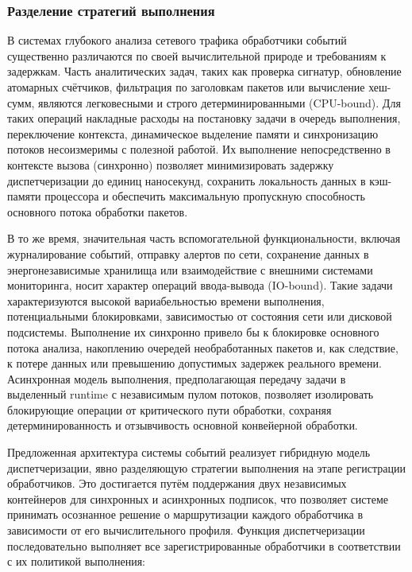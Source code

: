\subsubsection{Разделение стратегий выполнения}
В системах глубокого анализа сетевого трафика обработчики событий существенно различаются по своей вычислительной природе и требованиям к задержкам.
Часть аналитических задач, таких как проверка сигнатур, обновление атомарных счётчиков, фильтрация по заголовкам пакетов или вычисление хеш-сумм, являются легковесными и строго детерминированными (CPU-bound).
Для таких операций накладные расходы на постановку задачи в очередь выполнения, переключение контекста, динамическое выделение памяти и синхронизацию потоков несоизмеримы с полезной работой.
Их выполнение непосредственно в контексте вызова (синхронно) позволяет минимизировать задержку диспетчеризации до единиц наносекунд, сохранить локальность данных в кэш-памяти процессора и обеспечить максимальную пропускную способность основного потока обработки пакетов.

В то же время, значительная часть вспомогательной функциональности, включая журналирование событий, отправку алертов по сети, сохранение данных в энергонезависимые хранилища или взаимодействие с внешними системами мониторинга, носит характер операций ввода-вывода (IO-bound).
Такие задачи характеризуются высокой вариабельностью времени выполнения, потенциальными блокировками, зависимостью от состояния сети или дисковой подсистемы.
Выполнение их синхронно привело бы к блокировке основного потока анализа, накоплению очередей необработанных пакетов и, как следствие, к потере данных или превышению допустимых задержек реального времени.
Асинхронная модель выполнения, предполагающая передачу задачи в выделенный runtime с независимым пулом потоков, позволяет изолировать блокирующие операции от критического пути обработки, сохраняя детерминированность и отзывчивость основной конвейерной обработки.

Предложенная архитектура системы событий реализует гибридную модель диспетчеризации, явно разделяющую стратегии выполнения на этапе регистрации обработчиков. Это достигается путём поддержания двух независимых контейнеров для синхронных и асинхронных подписок, что позволяет системе принимать осознанное решение о маршрутизации каждого обработчика в зависимости от его вычислительного профиля. Функция диспетчеризации последовательно выполняет все зарегистрированные обработчики в соответствии с их политикой выполнения:

